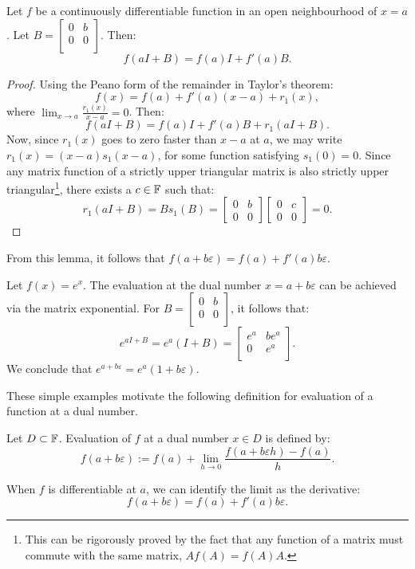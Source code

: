 \begin{lemma}
Let $f$ be a continuously differentiable function in an open neighbourhood of $x=a$. Let $B = \begin{bmatrix} 0 & b\\0 & 0\\\end{bmatrix}$. Then:
\[
f(aI+B) = f(a)I + f'(a)B.
\]
\end{lemma}
\begin{proof}
Using the Peano form of the remainder in Taylor's theorem:
\[
f(x) = f(a) + f'(a)(x-a) + r_1(x),
\]
where $\displaystyle\lim_{x\to a}\frac{r_1(x)}{x-a} = 0$. Then:
\[
f(aI+B) = f(a)I + f'(a)B + r_1(aI+B).
\]
Now, since $r_1(x)$ goes to zero faster than $x-a$ at $a$, we may write $r_1(x) = (x-a)s_1(x-a)$, for some function satisfying $s_1(0) = 0$. Since any matrix function of a strictly upper triangular matrix is also strictly upper triangular\footnote{This can be rigorously proved by the fact that any function of a matrix must commute with the same matrix, $Af(A) = f(A)A$.}, there exists a $c\in\mathbb{F}$ such that:
\[
r_1(aI+B) = Bs_1(B) = \begin{bmatrix} 0 & b\\ 0 & 0\end{bmatrix}\begin{bmatrix} 0 & c\\ 0 & 0\end{bmatrix} = 0.
\]
\end{proof}
From this lemma, it follows that $f(a+b\varepsilon) = f(a)+f'(a)b\varepsilon$.

\begin{example}
Let $f(x) = e^x$. The evaluation at the dual number $x=a+b\varepsilon$ can be achieved via the matrix exponential. For $B = \begin{bmatrix} 0 & b\\0 & 0\\\end{bmatrix}$, it follows that:
\[
e^{aI+B} = e^a(I + B) = \begin{bmatrix}e^a & be^a\\ 0 & e^a\\\end{bmatrix}.
\]
We conclude that $e^{a+b\varepsilon} = e^a(1+b\varepsilon)$.
\end{example}

These simple examples motivate the following definition for evaluation of a function at a dual number.
\begin{definition}
Let $D\subset\mathbb{F}$. Evaluation of $f$ at a dual number $x\in D$ is defined by:
\begin{equation}
f(a+b\varepsilon) := f(a) + \lim_{h\to0}\dfrac{f(a+b\varepsilon h)-f(a)}{h}.
\end{equation}
\end{definition}
When $f$ is differentiable at $a$, we can identify the limit as the derivative:
\[
f(a+b\varepsilon) = f(a) + f'(a)b\varepsilon.
\]

